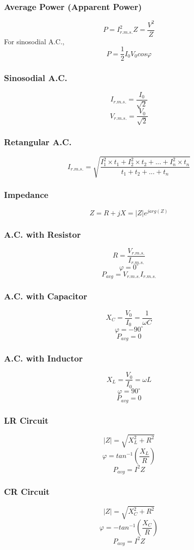 \documentclass{article}
\begin{document}
\subsubsection*{Average Power (Apparent Power)}
\[P=I_{r.m.s.}^2Z=\frac{V^2}{Z}\]
For sinosodial A.C.,
\[P=\frac{1}{2}I_0V_0cos\varphi\]

\subsubsection*{Sinosodial A.C.}
\[I_{r.m.s.}=\frac{I_0}{\sqrt{2}}\]
\[V_{r.m.s.}=\frac{V_0}{\sqrt{2}}\]

\subsubsection*{Retangular A.C.}
\[I_{r.m.s.}=\sqrt{\frac{I_1^2\times t_1+I_2^2\times t_2+...+I_n^2\times t_n}{t_1+t_2+...+t_n}}\]

\subsubsection{Impedance}
\[Z=R+jX=|Z|e^{jarg(Z)}\]

\subsubsection*{A.C. with Resistor}
\[R=\frac{V_{r.m.s.}}{I_{r.m.s.}}\]
\[\varphi=0^{\circ}\]
\[P_{avg}=V_{r.m.s.}I_{r.m.s.}\]

\subsubsection*{A.C. with Capacitor}
\[X_C=\frac{V_0}{I_0}=\frac{1}{\omega C}\]
\[\varphi=-90^{\circ}\]
\[P_{avg}=0\]

\subsubsection*{A.C. with Inductor}
\[X_L=\frac{V_0}{I_0}=\omega L\]
\[\varphi=90^{\circ}\]
\[P_{avg}=0\]

\subsubsection*{LR Circuit}
\[|Z|=\sqrt{X_L^2+R^2}\]
\[\varphi=tan^{-1}(\frac{X_L}{R})\]
\[P_{avg}=I^2Z\]

\subsubsection*{CR Circuit}
\[|Z|=\sqrt{X_C^2+R^2}\]
\[\varphi=-tan^{-1}(\frac{X_C}{R})\]
\[P_{avg}=I^2Z\]
\end{document}
